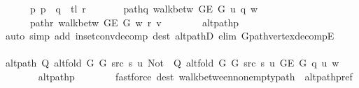 \begin{isabellebody}
\ \ \ \ \ \ p{\isacharcolon}{\kern0pt}\ {\isachardoublequoteopen}p\ {\isacharequal}{\kern0pt}\ q\ {\isacharat}{\kern0pt}\ tl\ r{\isachardoublequoteclose}\ \isanewline
\ \ \ \ \ \ path{\isacharunderscore}{\kern0pt}q{\isacharcolon}{\kern0pt}\ {\isachardoublequoteopen}walk{\isacharunderscore}{\kern0pt}betw\ {\isacharparenleft}{\kern0pt}G{\isachardot}{\kern0pt}E\ G{\isacharparenright}{\kern0pt}\ u\ q\ w{\isachardoublequoteclose}\ \isanewline
\ \ \ \ \ \ path{\isacharunderscore}{\kern0pt}r{\isacharcolon}{\kern0pt}\ {\isachardoublequoteopen}walk{\isacharunderscore}{\kern0pt}betw\ {\isacharparenleft}{\kern0pt}G{\isachardot}{\kern0pt}E\ G{\isacharparenright}{\kern0pt}\ w\ r\ v{\isachardoublequoteclose}\isanewline
\ \ \ \ \ \ \isamarkupfalse%
\ alt{\isacharunderscore}{\kern0pt}path{\isacharunderscore}{\kern0pt}p\isanewline
\ \ \ \ \ \ \isamarkupfalse%
\ {\isacharparenleft}{\kern0pt}auto\ simp\ add{\isacharcolon}{\kern0pt}\ in{\isacharunderscore}{\kern0pt}set{\isacharunderscore}{\kern0pt}conv{\isacharunderscore}{\kern0pt}decomp\ dest{\isacharcolon}{\kern0pt}\ alt{\isacharunderscore}{\kern0pt}pathD{\isacharparenleft}{\kern0pt}{}{\isacharparenright}{\kern0pt}\ elim{\isacharcolon}{\kern0pt}\ G{\isachardot}{\kern0pt}path{\isacharunderscore}{\kern0pt}vertex{\isacharunderscore}{\kern0pt}decompE{\isacharparenright}{\kern0pt}\isanewline
\ \ \ \ \isamarkupfalse%
\ {\isachardoublequoteopen}alt{\isacharunderscore}{\kern0pt}path\ {\isacharparenleft}{\kern0pt}Q\ {\isacharparenleft}{\kern0pt}alt{\isacharunderscore}{\kern0pt}fold\ G{}\ G{}\ src\ s{\isacharparenright}{\kern0pt}\ u{\isacharparenright}{\kern0pt}\ {\isacharparenleft}{\kern0pt}Not\ {\isasymcirc}\ Q\ {\isacharparenleft}{\kern0pt}alt{\isacharunderscore}{\kern0pt}fold\ G{}\ G{}\ src\ s{\isacharparenright}{\kern0pt}\ u{\isacharparenright}{\kern0pt}\ {\isacharparenleft}{\kern0pt}G{\isachardot}{\kern0pt}E\ G{\isacharparenright}{\kern0pt}\ q\ u\ w{\isachardoublequoteclose}\isanewline
\ \ \ \ \ \ \isamarkupfalse%
\ alt{\isacharunderscore}{\kern0pt}path{\isacharunderscore}{\kern0pt}p\isanewline
\ \ \ \ \ \ \isamarkupfalse%
\ {\isacharparenleft}{\kern0pt}fastforce\ dest{\isacharcolon}{\kern0pt}\ walk{\isacharunderscore}{\kern0pt}between{\isacharunderscore}{\kern0pt}nonempty{\isacharunderscore}{\kern0pt}path{\isacharparenleft}{\kern0pt}{}{\isacharcomma}{\kern0pt}\ {}{\isacharparenright}{\kern0pt}\ alt{\isacharunderscore}{\kern0pt}path{\isacharunderscore}{\kern0pt}pref{\isacharunderscore}{\kern0pt}{}{\isacharparenright}{\kern0pt}\isanewline

\end{isabellebody}
